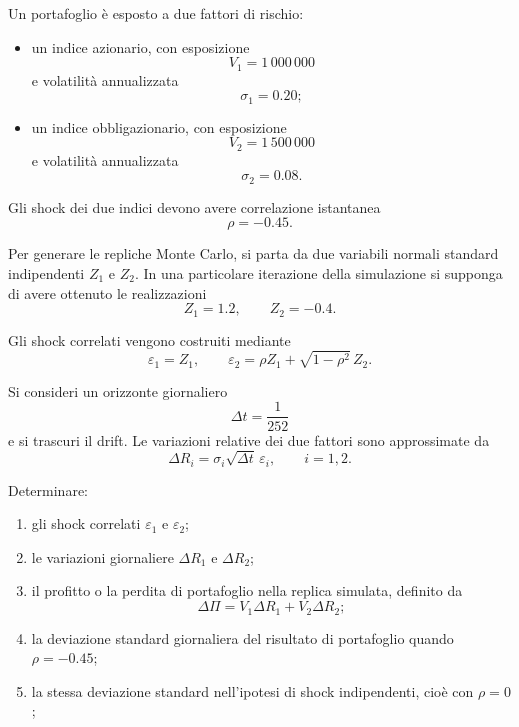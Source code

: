 \begin{exercise}
\label{ex:cap06-scenario-correlato-portafoglio}

Un portafoglio \`{e} esposto a due fattori di rischio:

\begin{itemize}
\item un indice azionario, con esposizione
\[
V_1=1\,000\,000
\]
e volatilit\`{a} annualizzata
\[
\sigma_1=0.20;
\]

\item un indice obbligazionario, con esposizione
\[
V_2=1\,500\,000
\]
e volatilit\`{a} annualizzata
\[
\sigma_2=0.08.
\]
\end{itemize}

Gli shock dei due indici devono avere correlazione istantanea
\[
\rho=-0.45.
\]

Per generare le repliche Monte Carlo, si parta da due variabili normali
standard indipendenti $Z_1$ e $Z_2$. In una particolare iterazione
della simulazione si supponga di avere ottenuto le realizzazioni
\[
Z_1=1.2,
\qquad
Z_2=-0.4.
\]

Gli shock correlati vengono costruiti mediante
\[
\varepsilon_1=Z_1,
\qquad
\varepsilon_2
=
\rho Z_1+\sqrt{1-\rho^2}\,Z_2.
\]

Si consideri un orizzonte giornaliero
\[
\Delta t=\frac{1}{252}
\]
e si trascuri il drift. Le variazioni relative dei due fattori sono
approssimate da
\[
\Delta R_i
=
\sigma_i\sqrt{\Delta t}\,\varepsilon_i,
\qquad
i=1,2.
\]

Determinare:

\begin{enumerate}
\item gli shock correlati $\varepsilon_1$ e $\varepsilon_2$;
\item le variazioni giornaliere $\Delta R_1$ e $\Delta R_2$;
\item il profitto o la perdita di portafoglio nella replica simulata,
definito da
\[
\Delta\Pi
=
V_1\Delta R_1+V_2\Delta R_2;
\]
\item la deviazione standard giornaliera del risultato di portafoglio
quando $\rho=-0.45$;
\item la stessa deviazione standard nell'ipotesi di shock indipendenti,
cio\`{e} con $\rho=0$;

\end{enumerate}

\end{exercise}

